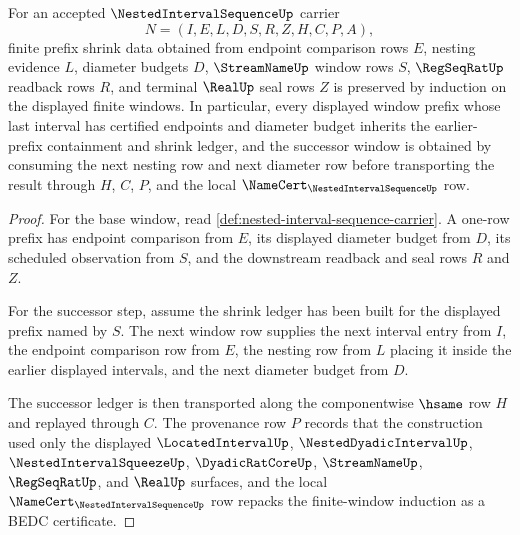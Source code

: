 \begin{theorem}
\label{thm:nested-interval-sequence-shrink-induction}
For an accepted $\NestedIntervalSequenceUp$ carrier
$$
N=(I,E,L,D,S,R,Z,H,C,P,A),
$$
finite prefix shrink data obtained from endpoint comparison rows $E$, nesting evidence $L$, diameter budgets $D$, $\StreamNameUp$ window rows $S$, $\RegSeqRatUp$ readback rows $R$, and terminal $\RealUp$ seal rows $Z$ is preserved by induction on the displayed finite windows. In particular, every displayed window prefix whose last interval has certified endpoints and diameter budget inherits the earlier-prefix containment and shrink ledger, and the successor window is obtained by consuming the next nesting row and next diameter row before transporting the result through $H$, $C$, $P$, and the local $\NameCert_{\NestedIntervalSequenceUp}$ row.
\end{theorem}
\begin{proof}
For the base window, read \autoref{def:nested-interval-sequence-carrier}. A one-row prefix has endpoint comparison from $E$, its displayed diameter budget from $D$, its scheduled observation from $S$, and the downstream readback and seal rows $R$ and $Z$.

For the successor step, assume the shrink ledger has been built for the displayed prefix named by $S$. The next window row supplies the next interval entry from $I$, the endpoint comparison row from $E$, the nesting row from $L$ placing it inside the earlier displayed intervals, and the next diameter budget from $D$.

The successor ledger is then transported along the componentwise $\hsame$ row $H$ and replayed through $C$. The provenance row $P$ records that the construction used only the displayed $\LocatedIntervalUp$, $\NestedDyadicIntervalUp$, $\NestedIntervalSqueezeUp$, $\DyadicRatCoreUp$, $\StreamNameUp$, $\RegSeqRatUp$, and $\RealUp$ surfaces, and the local $\NameCert_{\NestedIntervalSequenceUp}$ row repacks the finite-window induction as a BEDC certificate.
\end{proof}


